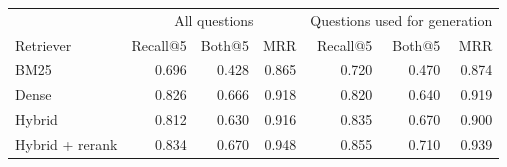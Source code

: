 \begin{tabular}{@{}lrrrrrr@{}}
\toprule
 & \multicolumn{3}{c}{All questions} & \multicolumn{3}{c}{Questions used for generation} \\
Retriever & Recall@5 & Both@5 & MRR & Recall@5 & Both@5 & MRR \\
\midrule
BM25 & 0.696 & 0.428 & 0.865 & 0.720 & 0.470 & 0.874 \\
Dense & 0.826 & 0.666 & 0.918 & 0.820 & 0.640 & 0.919 \\
Hybrid & 0.812 & 0.630 & 0.916 & 0.835 & 0.670 & 0.900 \\
Hybrid + rerank & 0.834 & 0.670 & 0.948 & 0.855 & 0.710 & 0.939 \\
\bottomrule
\end{tabular}
